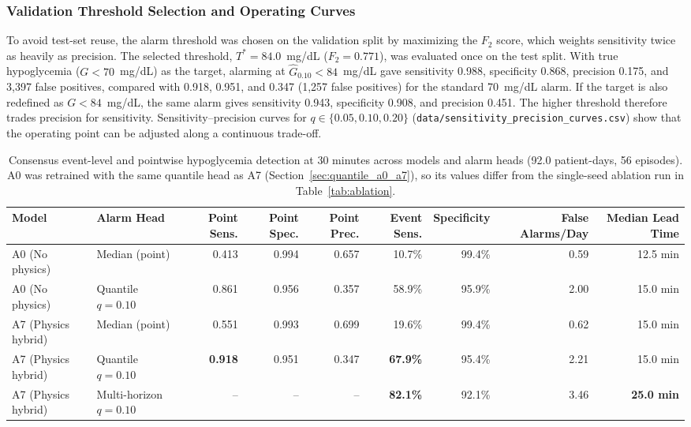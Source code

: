 \documentclass[journal]{IEEEtran}
\begin{document}
\subsubsection{Validation Threshold Selection and Operating Curves}
\label{sec:validation_threshold_selection}
To avoid test-set reuse, the alarm threshold was chosen on the validation split by maximizing the $F_2$ score, which weights sensitivity twice as heavily as precision. The selected threshold, $T^* = 84.0$~mg/dL ($F_2 = 0.771$), was evaluated once on the test split. With true hypoglycemia ($G < 70$~mg/dL) as the target, alarming at $\hat{G}_{0.10} < 84$~mg/dL gave sensitivity 0.988, specificity 0.868, precision 0.175, and 3,397 false positives, compared with 0.918, 0.951, and 0.347 (1,257 false positives) for the standard 70~mg/dL alarm. If the target is also redefined as $G < 84$~mg/dL, the same alarm gives sensitivity 0.943, specificity 0.908, and precision 0.451. The higher threshold therefore trades precision for sensitivity. Sensitivity--precision curves for $q \in \{0.05, 0.10, 0.20\}$ (\texttt{data/sensitivity\_precision\_curves.csv}) show that the operating point can be adjusted along a continuous trade-off.

\begin{table}[t]
\centering
\caption{Consensus event-level and pointwise hypoglycemia detection at 30 minutes across models and alarm heads (92.0 patient-days, 56 episodes). A0 was retrained with the same quantile head as A7 (Section~\ref{sec:quantile_a0_a7}), so its values differ from the single-seed ablation run in Table~\ref{tab:ablation}.}
\label{tab:hypo_event}
\footnotesize
\begin{tabular}{llrrrrrrr}
\toprule
Model & Alarm Head & Point Sens. & Point Spec. & Point Prec. & Event Sens. & Specificity & False Alarms/Day & Median Lead Time \\
\midrule
A0 (No physics) & Median (point) & 0.413 & 0.994 & 0.657 & 10.7\% & 99.4\% & 0.59 & 12.5 min \\
A0 (No physics) & Quantile $q=0.10$ & 0.861 & 0.956 & 0.357 & 58.9\% & 95.9\% & 2.00 & 15.0 min \\
\midrule
A7 (Physics hybrid) & Median (point) & 0.551 & 0.993 & 0.699 & 19.6\% & 99.4\% & 0.62 & 15.0 min \\
A7 (Physics hybrid) & Quantile $q=0.10$ & \textbf{0.918} & 0.951 & 0.347 & \textbf{67.9\%} & 95.4\% & 2.21 & 15.0 min \\
A7 (Physics hybrid) & Multi-horizon $q=0.10$ & -- & -- & -- & \textbf{82.1\%} & 92.1\% & 3.46 & \textbf{25.0 min} \\
\bottomrule
\end{tabular}
\end{table}
\end{document}
